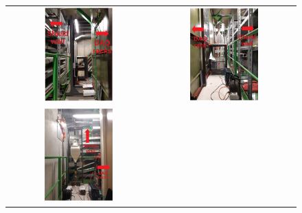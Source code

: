 \newpage
\begin{figure}[h]
  \begin{center}
    \begin{tabular}[t]{cc}
      \includegraphics[width=0.5\textwidth]{figs/INT/Initial.pdf} &
      \includegraphics[width=0.5\textwidth]{figs/INT/Back_central.pdf} \\
      \includegraphics[width=0.5\textwidth]{figs/INT/Othercorner.pdf} &

\end{tabular}
\end{center}
\end{figure}
